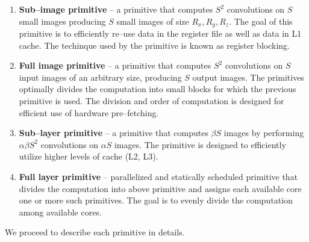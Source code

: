   \begin{enumerate}
  \item {\bf Sub--image primitive} -- a primitive that computes $S^2$
    convolutions on $S$ small images producing $S$ small images of
    size $R_x, R_y, R_z$.  The goal of this primitive is to
    efficiently re--use data in the register file as well as data in
    L1 cache.  The techinque used by the primitive is known as
    register blocking.
  \item {\bf Full image primitive} -- a primitive that computes $S^2$
    convolutions on $S$ input images of an arbitrary size, producing
    $S$ output images.  The primitives optimally divides the
    computation into small blocks for which the previous primitive is
    used.  The division and order of computation is designed for
    efficient use of hardware pre--fetching.
  \item {\bf Sub--layer primitive} -- a primitive that computes
    $\beta S$ images by performing $\alpha \beta S^2$
    convolutions on $\alpha S$ images.  The primitive is designed to
    efficiently utilize higher levels of cache (L2, L3).
  \item {\bf Full layer primitive} -- parallelized and statically
    scheduled primitive that divides the computation into above
    primitive and assigns each available core one or more such
    primitives.  The goal is to evenly divide the computation among
    available cores.
  \end{enumerate}

  We proceed to describe each primitive in details.

